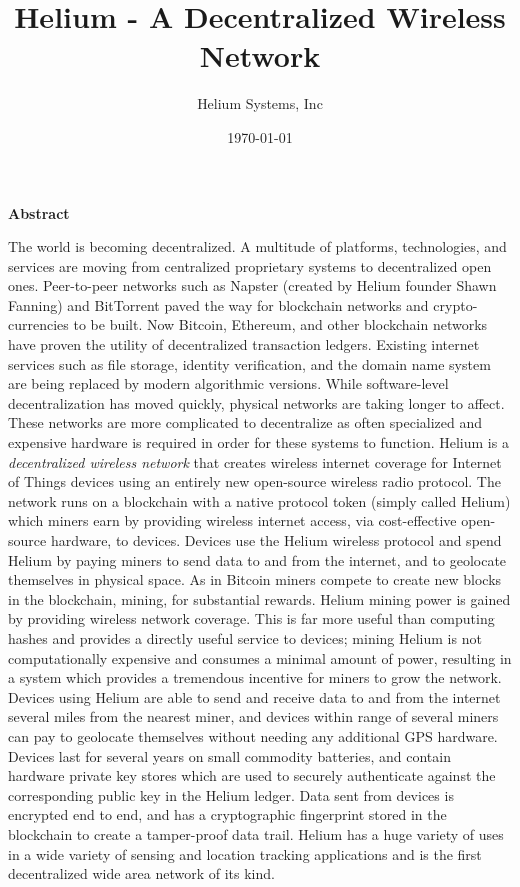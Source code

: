 \documentclass[letterpaper,11pt]{article}
\begin{document}
\title{Helium - A Decentralized Wireless Network}
\author{Helium Systems, Inc}
\date{\today}
\maketitle
\newpage

{\large \textbf{Abstract}}\newline

The world is becoming decentralized. A multitude of platforms, technologies, and services are moving from centralized proprietary systems to decentralized open ones. Peer-to-peer networks such as Napster \cite{napster} (created by Helium founder Shawn Fanning) and BitTorrent paved the way for blockchain networks and crypto-currencies to be built. Now Bitcoin, Ethereum, and other blockchain networks have proven the utility of decentralized transaction ledgers. Existing internet services such as file storage, identity verification, and the domain name system are being replaced by modern algorithmic versions. While software-level decentralization has moved quickly, physical networks are taking longer to affect. These networks are more complicated to decentralize as often specialized and expensive hardware is required in order for these systems to function.\newline
\newline
Helium is a \textit{decentralized wireless network} that creates wireless internet coverage for Internet of Things devices using an entirely new open-source wireless radio protocol. The network runs on a blockchain with a native protocol token (simply called Helium) which miners earn by providing wireless internet access, via cost-effective open-source hardware, to devices. Devices use the Helium wireless protocol and spend Helium by paying miners to send data to and from the internet, and to geolocate themselves in physical space. As in Bitcoin miners compete to create new blocks in the blockchain, mining, for substantial rewards. Helium mining power is gained by providing wireless network coverage. This is far more useful than computing hashes and provides a directly useful service to devices; mining Helium is not computationally expensive and consumes a minimal amount of power, resulting in a system which provides a tremendous incentive for miners to grow the network. Devices using Helium are able to send and receive data to and from the internet several miles from the nearest miner, and devices within range of several miners can pay to geolocate themselves without needing any additional GPS hardware. Devices last for several years on small commodity batteries, and contain hardware private key stores which are used to securely authenticate against the corresponding public key in the Helium ledger. Data sent from devices is encrypted end to end, and has a cryptographic fingerprint stored in the blockchain to create a tamper-proof data trail.
\newline\newline
Helium has a huge variety of uses in a wide variety of sensing and location tracking applications and is the first decentralized wide area network of its kind.
\end{document}
